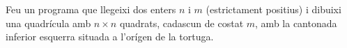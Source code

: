 

\Statement

Feu un programa que llegeixi dos enters $n$ i $m$ (estrictament positius)
i dibuixi una quadrícula amb $n \times n$ quadrats, 
cadascun de costat $m$, amb la cantonada inferior esquerra
situada a l'orígen de la tortuga.

\Sample

